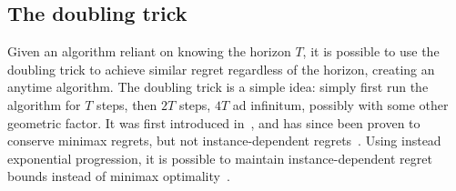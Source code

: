 \subsection{The doubling trick}
Given an algorithm reliant on knowing the horizon $T$, it is possible to use the doubling trick to achieve similar regret regardless of the horizon, creating an anytime algorithm.
The doubling trick is a simple idea: simply first run the algorithm for $T$ steps, then $2T$ steps, $4T$ ad infinitum, possibly with some other geometric factor.
It was first introduced in~\autocite{auer1995}, and has since been proven to conserve minimax regrets, but not instance-dependent regrets~\autocite{besson2018}.
Using instead exponential progression, it is possible to maintain instance-dependent regret bounds instead of minimax optimality~\autocite{besson2018}.
